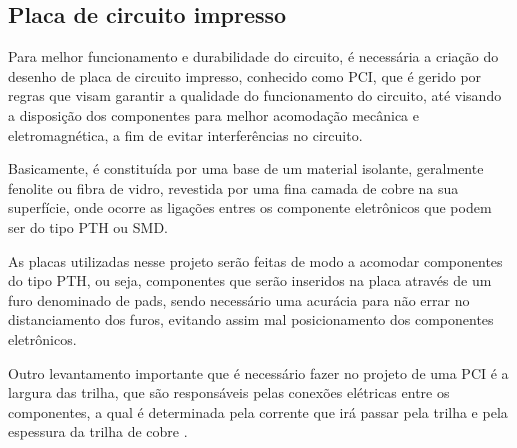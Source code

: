 \subsection{Placa de circuito impresso}

\par Para melhor funcionamento  e durabilidade do circuito, é necessária a criação do desenho de placa de circuito impresso, conhecido como PCI, que é gerido por regras que visam garantir a qualidade do funcionamento do circuito, até visando a disposição dos componentes para melhor acomodação mecânica e eletromagnética, a fim de evitar interferências no circuito.
\par Basicamente, é constituída por uma base de um material isolante, geralmente fenolite ou fibra de vidro, revestida por uma fina camada de cobre na sua superfície, onde ocorre as ligações entres os componente eletrônicos que podem ser do tipo PTH ou SMD\cite{pci}. 

\par As placas utilizadas nesse projeto serão feitas de modo a acomodar componentes do tipo PTH, ou seja, componentes que serão inseridos na placa através de um furo denominado de pads, sendo necessário uma acurácia para não errar no distanciamento dos furos, evitando assim mal posicionamento dos componentes eletrônicos.
\par Outro levantamento importante que é necessário fazer no projeto de uma PCI é a largura das trilha, que são responsáveis pelas conexões elétricas entre os componentes, a qual é determinada pela corrente que irá passar pela trilha e pela espessura da trilha de cobre \cite{ TecnicasdeProjetosPCI}.

